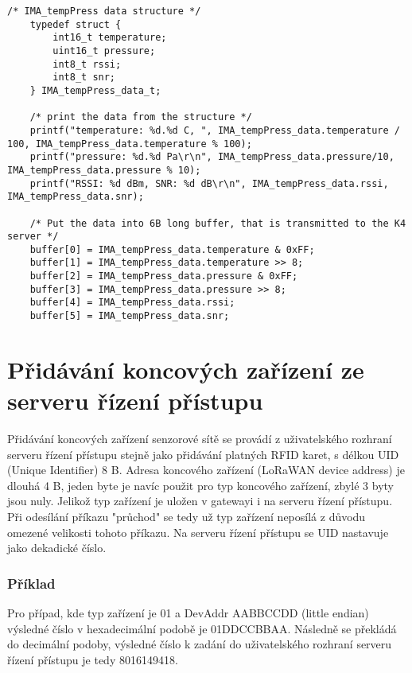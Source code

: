 \begin{lstlisting}[style=CStyle]
    /* IMA_tempPress data structure */   
    typedef struct {
        int16_t temperature;
        uint16_t pressure;
        int8_t rssi;
        int8_t snr;
    } IMA_tempPress_data_t;
     
    /* print the data from the structure */
    printf("temperature: %d.%d C, ", IMA_tempPress_data.temperature / 100, IMA_tempPress_data.temperature % 100);
    printf("pressure: %d.%d Pa\r\n", IMA_tempPress_data.pressure/10, IMA_tempPress_data.pressure % 10);
    printf("RSSI: %d dBm, SNR: %d dB\r\n", IMA_tempPress_data.rssi, IMA_tempPress_data.snr);

    /* Put the data into 6B long buffer, that is transmitted to the K4 server */
    buffer[0] = IMA_tempPress_data.temperature & 0xFF;
    buffer[1] = IMA_tempPress_data.temperature >> 8;
    buffer[2] = IMA_tempPress_data.pressure & 0xFF;
    buffer[3] = IMA_tempPress_data.pressure >> 8;
    buffer[4] = IMA_tempPress_data.rssi;
    buffer[5] = IMA_tempPress_data.snr;
\end{lstlisting}



\section{Přidávání koncových zařízení ze serveru řízení přístupu}
Přidávání koncových zařízení senzorové sítě se provádí z uživatelského rozhraní serveru řízení přístupu stejně jako přidávání platných RFID karet, s délkou UID (Unique Identifier) 8 B.
Adresa koncového zařízení (LoRaWAN device address) je dlouhá 4 B, jeden byte je navíc použit pro typ koncového zařízení, zbylé 3 byty jsou nuly.
Jelikož typ zařízení je uložen v gatewayi i na serveru řízení přístupu. Při odesílání příkazu "průchod" se tedy už typ zařízení neposílá z důvodu omezené velikosti tohoto příkazu.
Na serveru řízení přístupu se UID nastavuje jako dekadické číslo.

\subsubsection{Příklad}
Pro případ, kde typ zařízení je 01 a DevAddr AABBCCDD (little endian) výsledné číslo v hexadecimální podobě je 01DDCCBBAA. Následně se překládá do decimální podoby, výsledné číslo k zadání do uživatelského rozhraní serveru řízení přístupu je tedy 8016149418.












